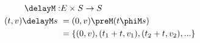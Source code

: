 \documentclass[preview]{standalone}
\begin{document}
\begin{align*}
    \delayM : & E  \times S \rightarrow S\\
    (t,v) \delayM s\ & = (0,v) \preM (t \phiM s)\\
    &=\{(0,v),(t_1+t,v_1),(t_2+t,v_2),...\}\nonumber
\end{align*}
\end{document}

